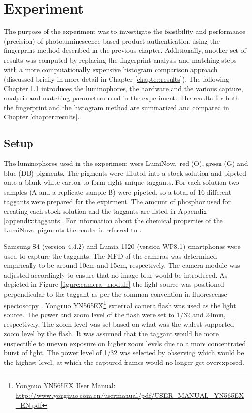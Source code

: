 \documentclass[thesis.tex]{subfiles}
\begin{document}
\chapter{Experiment}
\label{chapter:experiment}

The purpose of the experiment was to investigate the feasibility and performance (precision) of photoluminescence-based product authentication using the fingerprint method described in the previous chapter. Additionally, another set of results was computed by replacing the fingerprint analysis and matching steps with a more computationally expensive histogram comparison approach (discussed briefly in more detail in Chapter \ref{chapter:results}). The following Chapter \ref{chapter:setup} introduces the luminophores, the hardware and the various capture, analysis and matching parameters used in the experiment. The results for both the fingerprint and the histogram method are summarized and compared in Chapter \ref{chapter:results}.

\section{Setup}
\label{chapter:setup}

The luminophores used in the experiment were LumiNova\textregistered\ red (O), green (G) and blue (DB) pigments. The pigments were diluted into a stock solution and pipeted onto a blank white carton to form eight unique taggants. For each solution two samples (A and a replicate sample B) were pipeted, so a total of 16 different taggants were prepared for the expirment. The amount of phosphor used for creating each stock solution and the taggants are listed in Appendix \ref{appendix:taggants}. For information about the chemical properties of the LumiNova\textregistered\ pigments the reader is referred to \cite{luminova}.

Samsung S4 (version 4.4.2) and Lumia 1020 (version WP8.1) smartphones were used to capture the taggants. The MFD of the cameras was determined empirically to be around 10cm and 15cm, respectively. The camera module was adjusted accordingly to ensure that no image blur would be introduced. As depicted in Figure \ref{figure:camera_module} the light source was positioned perpendicular to the taggant as per the common convention in fluorescense spectoscopy \cite{spectroscopy-principles}. Yongnuo YN565EX\footnote{Yongnuo YN565EX User Manual: \url{http://www.yongnuo.com.cn/usermanual/pdf/USER_MANUAL_YN565EX_EN.pdf}} external camera flash was used as the light source. The power and zoom level of the flash were set to 1/32 and 24mm, respectively. The zoom level was set based on what was the widest supported zoom level by the flash. It was assumed that the taggant would be more suspectible to uneven exposure on higher zoom levels due to a more concentrated burst of light. The power level of 1/32 was selected by observing which would be the highest level, at which the captured frames would no longer get overexposed.
\end{document}
